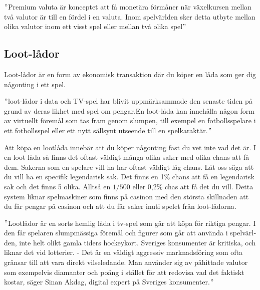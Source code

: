\documentclass[11p]{article}
\begin{document}
\begin{otherlanguage}{swedish}
        \setlength{\leftskip}{1cm}

        \("\)Premium valuta är konceptet att få monetära förmåner när växelkursen mellan två valutor är till en fördel i en valuta.
        Inom spelvärlden sker detta utbyte mellan olika valutor inom ett visst spel eller mellan två olika spel\("\)\parencite{bananatic}

        \setlength{\leftskip}{0cm}

        \subsection{Loot-lådor}

        Loot-lådor är en form av ekonomisk transaktion där du köper en låda som ger dig någonting i ett spel.

        \setlength{\leftskip}{1cm}

        \("\)loot-lådor i data och TV-spel har blivit uppmärksammade den senaste tiden på grund av deras likhet med spel om pengar.En loot-låda kan innehålla någon form av virtuellt föremål som tas fram genom slumpen, till exempel en fotbollsspelare i ett fotbollsspel eller ett nytt sällsynt utseende till en spelkaraktär.\("\)\parencite{sverigesradio}

        \setlength{\leftskip}{0cm}

        Att köpa en lootlåda innebär att du köper någonting fast du vet inte vad det är.
        I en loot låda så finns det oftast väldigt många olika saker med olika chans att få dem.
        Sakerna som en spelare vill ha har oftast väldigt låg chans.
        Låt oss säga att du vill ha en specifik legendarisk sak.
        Det finns en 1\% chans att få en legendarisk sak och det finns 5 olika.
        Alltså en \(1/500\) eller 0,2\% chas att få det du vill.
        Detta system liknar spelmaskiner som finns på casinon med den största skillnaden att du får pengar på casinon och att du får saker inuti spelet från loot-lådorna.


        \setlength{\leftskip}{1cm}

        \("\)Lootlådor är en sorts hemlig låda i tv-spel som går att köpa för riktiga pengar.
        I den får spelaren slumpmässiga föremål och figurer som går att använda i spelvärlden, inte helt olikt gamla tiders hockeykort.
        Sveriges konsumenter är kritiska, och liknar det vid lotterier.
        - Det är en väldigt aggressiv marknadsföring som ofta gränsar till att vara direkt vilseledande.
        Man använder sig av påhittade valutor som exempelvis diamanter och poäng i stället för att redovisa vad det faktiskt kostar, säger Sinan Akdag, digital expert på Sveriges konsumenter.\("\)\parencite{loot}


\end{otherlanguage}
\end{document}
